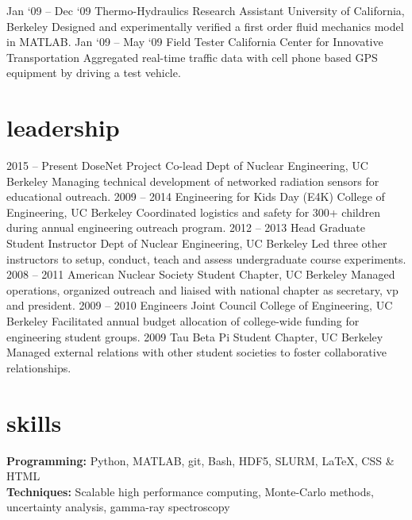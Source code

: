 \documentclass{resume} %
\begin{document}
\begin{entrylist}
	\entry
		{Jan `09 -- Dec `09}
		{Thermo-Hydraulics Research Assistant}
		{University of California, Berkeley}
		{
		Designed and experimentally verified a first order fluid mechanics model in MATLAB.
		}
	\entry
		{Jan `09 -- May `09}
		{Field Tester}
		{California Center for Innovative Transportation}
		{
		Aggregated real-time traffic data with cell phone based GPS equipment by driving a test vehicle.%
		}
\end{entrylist}

\section{leadership}
\begin{entrylist}
	\entry
		{2015 -- Present}
		{DoseNet Project Co-lead}
		{Dept of Nuclear Engineering, UC Berkeley}
		{
		Managing technical development of networked radiation sensors for educational outreach. 
		}
	\entry
		{2009 -- 2014}
		{Engineering for Kids Day (E4K)}
		{College of Engineering, UC Berkeley}
		{
		Coordinated logistics and safety for 300+ children during annual engineering outreach program.
		}
	\entry
		{2012 -- 2013}
		{Head Graduate Student Instructor}
		{Dept of Nuclear Engineering, UC Berkeley}
		{
		Led three other instructors to setup, conduct, teach and assess undergraduate course experiments.
		}
	\entry
		{2008 -- 2011}
		{American Nuclear Society}
		{Student Chapter, UC Berkeley}
		{
		Managed operations, organized outreach and liaised with national chapter as secretary, vp and president.%
		}
	\entry
		{2009 -- 2010}
		{Engineers Joint Council}
		{College of Engineering, UC Berkeley}
		{
		Facilitated annual budget allocation of college-wide funding for engineering student groups.
		}
	\entry
		{2009}
		{Tau Beta Pi}
		{Student Chapter, UC Berkeley}
		{
		Managed external relations with other student societies to foster collaborative relationships.
		}
\end{entrylist}

\section{skills}
\textbf{Programming:} Python, MATLAB, git, Bash, HDF5, SLURM, \LaTeX, CSS \& HTML\\
\textbf{Techniques:} Scalable high performance computing, Monte-Carlo methods, uncertainty analysis, gamma-ray spectroscopy
\end{document}
